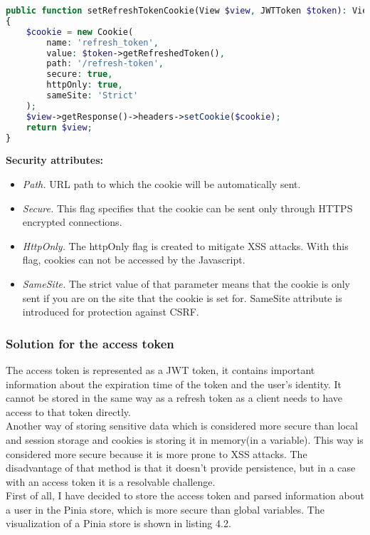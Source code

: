 \begin{lstlisting}[language=PHP, caption=Cookies setting on server]
public function setRefreshTokenCookie(View $view, JWTToken $token): View
{
    $cookie = new Cookie(
        name: 'refresh_token',
        value: $token->getRefreshedToken(),
        path: '/refresh-token',
        secure: true,
        httpOnly: true,
        sameSite: 'Strict'
    );
    $view->getResponse()->headers->setCookie($cookie);
    return $view;
}
\end{lstlisting}

\noindent \textbf{Security attributes: \cite{cookies-flags}}

\begin{itemize}
    \item \emph{Path.} URL path to which the cookie will be automatically sent.
    \item \emph{Secure.} This flag specifies that the cookie can be sent only through HTTPS encrypted connections.
    \item \emph{HttpOnly.} The httpOnly flag is created to mitigate XSS attacks. With this flag, cookies can not be accessed by the Javascript.
    \item \emph{SameSite.} The strict value of that parameter means that the cookie is only sent if you are on the site that the cookie is set for. SameSite attribute is introduced for protection against CSRF. 
\end{itemize}


\subsubsection{Solution for the access token} The access token is represented as a JWT token, it contains important information about the expiration time of the token and the user's identity. It cannot be stored in the same way as a refresh token as a client needs to have access to that token directly.\\
Another way of storing sensitive data which is considered more secure than local and session storage and cookies is storing it in memory(in a variable). This way is considered more secure because it is more prone to XSS attacks. The disadvantage of that method is that it doesn't provide persistence, but in a case with an access token it is a resolvable challenge.\\
First of all, I have decided to store the access token and parsed information about a user in the Pinia store, which is more secure than global variables. The visualization of a Pinia store is shown in listing 4.2.

